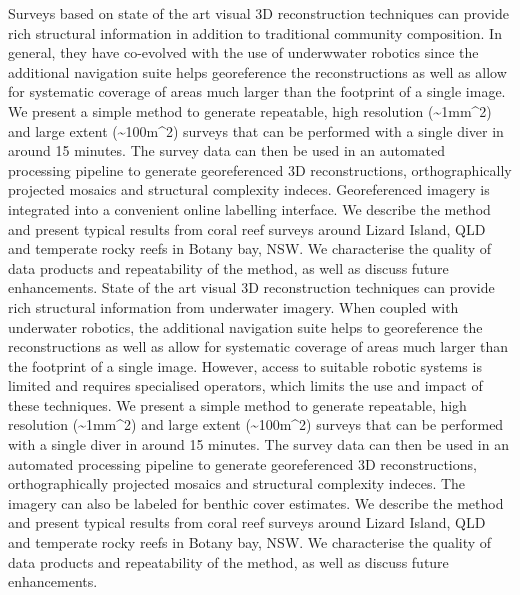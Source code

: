 Surveys based on state of the art visual 3D reconstruction techniques can provide rich structural information in addition to traditional community composition. In general, they have co-evolved with the use of underwwater robotics since the additional navigation suite helps georeference the reconstructions as well as allow for systematic coverage of areas much larger than the footprint of a single image. We present a simple method to generate repeatable, high resolution (\sim{1mm^{2}}) and large extent (\sim{100m^{2}}) surveys that can be performed with a single diver in around 15 minutes. The survey data can then be used in an automated processing pipeline to generate georeferenced 3D reconstructions, orthographically projected mosaics and structural complexity indeces. Georeferenced imagery is integrated into a convenient online labelling interface. 
We describe the method and present typical results from coral reef surveys around Lizard Island, QLD and temperate rocky reefs in Botany bay, NSW. We characterise the quality of data products and repeatability of the method, as well as discuss future enhancements.
State of the art visual 3D reconstruction techniques can provide rich structural information from underwater imagery. When coupled with underwater robotics, the additional navigation suite helps to georeference the reconstructions as well as allow for systematic coverage of areas much larger than the footprint of a single image. However, access to suitable robotic systems is limited and requires specialised operators, which limits the use and impact of these techniques.
We present a simple method to generate repeatable, high resolution (\sim{1mm^{2}}) and large extent (\sim{100m^{2}}) surveys that can be performed with a single diver in around 15 minutes. The survey data can then be used in an automated processing pipeline to generate georeferenced 3D reconstructions, orthographically projected mosaics and structural complexity indeces. The imagery can also be labeled for benthic cover estimates.
We describe the method and present typical results from coral reef surveys around Lizard Island, QLD and temperate rocky reefs in Botany bay, NSW. We characterise the quality of data products and repeatability of the method, as well as discuss future enhancements.